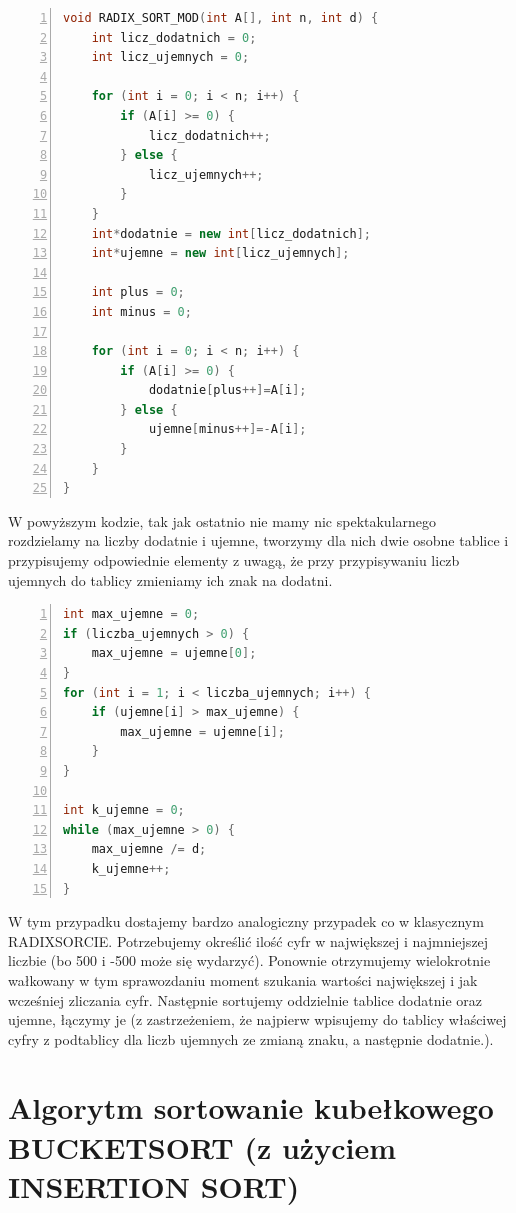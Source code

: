\documentclass{article}
\begin{document}
\begin{lstlisting}[language=C++, caption={Kod funkcji sortowania pozycyjnego z modyfikacją}, numbers=left, frame=single, xleftmargin=20pt]
void RADIX_SORT_MOD(int A[], int n, int d) {
	int licz_dodatnich = 0;
	int licz_ujemnych = 0;
	
	for (int i = 0; i < n; i++) {
		if (A[i] >= 0) {
			licz_dodatnich++;
		} else {
			licz_ujemnych++;
		}
	}
	int*dodatnie = new int[licz_dodatnich];
	int*ujemne = new int[licz_ujemnych];
	
	int plus = 0;
	int minus = 0;
	
	for (int i = 0; i < n; i++) {
		if (A[i] >= 0) {
			dodatnie[plus++]=A[i];
		} else {
			ujemne[minus++]=-A[i];
		}
	}
}
\end{lstlisting}

\large{W powyższym kodzie, tak jak ostatnio nie mamy nic spektakularnego rozdzielamy na liczby dodatnie i ujemne, tworzymy dla nich dwie osobne tablice i przypisujemy odpowiednie elementy z uwagą, że przy przypisywaniu liczb ujemnych do tablicy zmieniamy ich znak na dodatni.} \\

\begin{lstlisting}[language=C++, caption={Kod funkcji sortowania pozycyjnego z modyfikacją}, numbers=left, frame=single, xleftmargin=20pt]
int max_ujemne = 0;
if (liczba_ujemnych > 0) {
	max_ujemne = ujemne[0];
}
for (int i = 1; i < liczba_ujemnych; i++) {
	if (ujemne[i] > max_ujemne) {
		max_ujemne = ujemne[i];
	}
}

int k_ujemne = 0;
while (max_ujemne > 0) {
	max_ujemne /= d;
	k_ujemne++;
}
\end{lstlisting}

\large{W tym przypadku dostajemy bardzo analogiczny przypadek co w klasycznym RADIXSORCIE. Potrzebujemy określić ilość cyfr w największej i najmniejszej liczbie (bo 500 i -500 może się wydarzyć). Ponownie otrzymujemy wielokrotnie wałkowany w tym sprawozdaniu moment szukania wartości największej i jak wcześniej zliczania cyfr. Następnie sortujemy oddzielnie tablice dodatnie oraz ujemne, łączymy je (z zastrzeżeniem, że najpierw wpisujemy do tablicy właściwej cyfry z podtablicy dla liczb ujemnych ze zmianą znaku, a następnie dodatnie.).}\\


\section{Algorytm sortowanie kubełkowego BUCKETSORT (z użyciem INSERTION SORT)}
\end{document}
